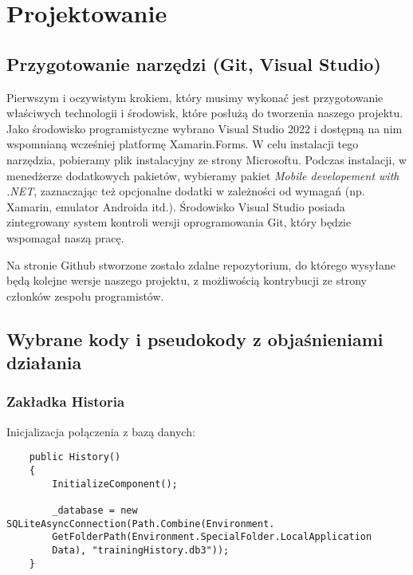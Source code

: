 	\newpage
\section{Projektowanie}		%

\subsection{Przygotowanie narzędzi (Git, Visual Studio)}		%

\hspace{0.60cm}Pierwszym i oczywistym krokiem, który musimy wykonać jest przygotowanie właściwych technologii i środowisk, które posłużą do tworzenia naszego projektu. Jako środowisko programistyczne wybrano Visual Studio 2022 i dostępną na nim wspomnianą wcześniej platformę Xamarin.Forms. W celu instalacji tego narzędzia, pobieramy plik instalacyjny ze strony Microsoftu. Podczas instalacji, w menedżerze dodatkowych pakietów, wybieramy pakiet \textit{Mobile developement with .NET}, zaznaczając też opcjonalne dodatki w zależności od wymagań (np. Xamarin, emulator Androida itd.). Środowisko Visual Studio posiada zintegrowany system kontroli wersji oprogramowania Git, który będzie wspomagał naszą pracę. 

\hspace{0.60cm}Na stronie Github stworzone zostało zdalne repozytorium, do którego wysyłane będą kolejne wersje naszego projektu, z możliwością kontrybucji ze strony członków zespołu programistów. 

\subsection{Wybrane kody i pseudokody z objaśnieniami działania}		%

\subsubsection{Zakładka Historia} %

\hspace{0.60cm}Inicjalizacja połączenia z bazą danych:
\begin{verbatim}
	public History()
	{
		InitializeComponent();
		
		_database = new SQLiteAsyncConnection(Path.Combine(Environment.
		GetFolderPath(Environment.SpecialFolder.LocalApplication
		Data), "trainingHistory.db3"));
	}
\end{verbatim}

